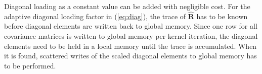 \documentclass[12pt,journal,onecolumn]{IEEEtran}
\newcommand{\mat}[1]{\mathbf{#1}}
\begin{document}
Diagonal loading as a constant value can be added with negligible cost. For the adaptive diagonal loading factor in (\ref{eq:diag}), the trace of $\mat{\hat{R}}$ has to be known before diagonal elements are written back to global memory. Since one row for all covariance matrices is written to global memory per kernel iteration, the diagonal elements need to be held in a local memory until the trace is accumulated. When it is found, scattered writes of the scaled diagonal elements to global memory has to be performed. 





\end{document}
